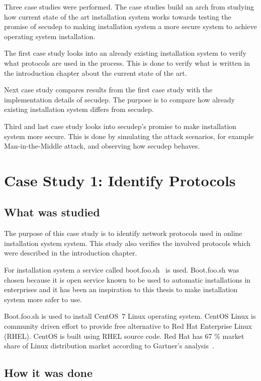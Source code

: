 
Three case studies were performed. The case studies build an arch from
studying how current state of the art installation system works
towards testing the promise of secudep to making installation system a
more secure system to achieve operating system installation.

The first case study looks into an already existing installation
system to verify what protocols are used in the process. This is done
to verify what is written in the introduction chapter about the
current state of the art.

Next case study compares results from the first case study with the
implementation details of secudep. The purpose is to compare how
already existing installation system differs from secudep.

Third and last case study looks into secudep's promise to make
installation system more secure. This is done by simulating the attack
scenarios, for example Man-in-the-Middle attack, and observing how
secudep behaves.


\section{Case Study 1: Identify Protocols}
\label{sec:casestudy1}

\subsection{What was studied}

The purpose of this case study is to identify network protocols used
in online installation system system. This study also verifies the
involved protocols which were described in the introduction chapter.

For installation system a service called
boot.foo.sh~\cite{boot-foo-sh} is used. Boot.foo.sh was chosen because
it is open service known to be used to automatic installations in
enterprises and it has been an inspiration to this thesis to make
installation system more safer to use.

Boot.foo.sh is used to install CentOS~7 Linux operating system. CentOS
Linux is community driven effort to provide free alternative to Red
Hat Enterprise Linux (RHEL). CentOS is built using RHEL source
code. Red Hat has 67 \% market share of Linux distribution market
according to Gartner's analysis~\cite{gartner-redhat}.

\subsection{How it was done}

